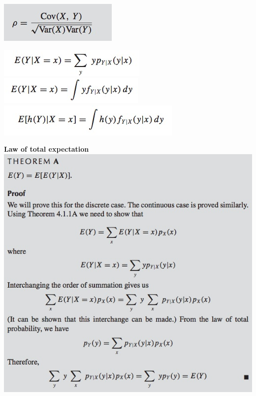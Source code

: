 \documentclass{/out/app/latex/examnotes}
\begin{document}
{

\includegraphics[scale=0.5]{./img/434.jpg}

\includegraphics[scale=0.5]{./img/441.jpg}
\includegraphics[scale=0.5]{./img/442.jpg}
\includegraphics[scale=0.5]{./img/443.jpg}


{\bf Law of total expectation}
\includegraphics[scale=0.5]{./img/44A.jpg}


}
\end{document}
